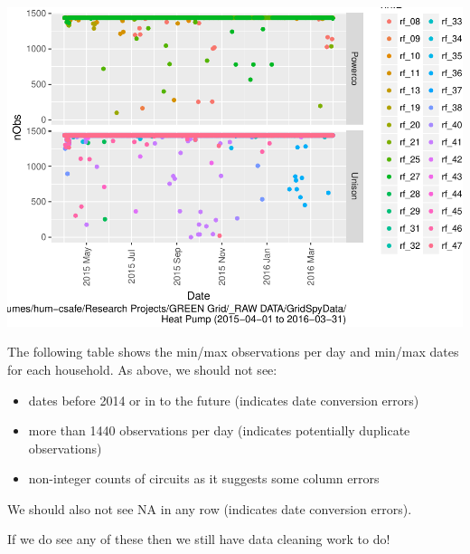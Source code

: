 \documentclass[]{article}
\providecommand{\tightlist}{%
  \setlength{\itemsep}{0pt}\setlength{\parskip}{0pt}}
\begin{document}
\includegraphics{nzGGHouseholdPowerDemandProfile_Heat Pump_2015-04-01_2016-03-31_files/figure-latex/loadedFilesObs point plot-1.pdf}

The following table shows the min/max observations per day and min/max
dates for each household. As above, we should not see:

\begin{itemize}
\tightlist
\item
  dates before 2014 or in to the future (indicates date conversion
  errors)
\item
  more than 1440 observations per day (indicates potentially duplicate
  observations)
\item
  non-integer counts of circuits as it suggests some column errors
\end{itemize}

We should also not see NA in any row (indicates date conversion errors).

If we do see any of these then we still have data cleaning work to do!
\end{document}
